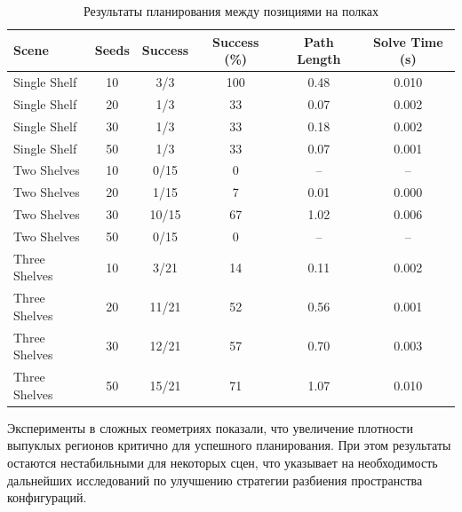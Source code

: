 \documentclass[a4paper,12pt]{extarticle}
\begin{document}
\begin{table}[H]
\centering
\caption{Результаты планирования между позициями на полках}
\begin{tabular}{lccccc}
\toprule
Scene & Seeds & Success & Success (\%) & Path Length & Solve Time (s) \\
\midrule
Single Shelf & 10 & 3/3 & 100 & 0.48 & 0.010 \\
Single Shelf & 20 & 1/3 & 33 & 0.07 & 0.002 \\
Single Shelf & 30 & 1/3 & 33 & 0.18 & 0.002 \\
Single Shelf & 50 & 1/3 & 33 & 0.07 & 0.001 \\
\midrule
Two Shelves & 10 & 0/15 & 0 & -- & -- \\
Two Shelves & 20 & 1/15 & 7 & 0.01 & 0.000 \\
Two Shelves & 30 & 10/15 & 67 & 1.02 & 0.006 \\
Two Shelves & 50 & 0/15 & 0 & -- & -- \\
\midrule
Three Shelves & 10 & 3/21 & 14 & 0.11 & 0.002 \\
Three Shelves & 20 & 11/21 & 52 & 0.56 & 0.001 \\
Three Shelves & 30 & 12/21 & 57 & 0.70 & 0.003 \\
Three Shelves & 50 & 15/21 & 71 & 1.07 & 0.010 \\
\bottomrule
\end{tabular}
\end{table}

Эксперименты в сложных геометриях показали, что увеличение плотности
выпуклых регионов критично для успешного планирования. При этом результаты
остаются нестабильными для некоторых сцен, что указывает на необходимость
дальнейших исследований по улучшению стратегии разбиения пространства конфигураций.


\newpage
\printbibliography[heading=bibintoc]
\end{document}
